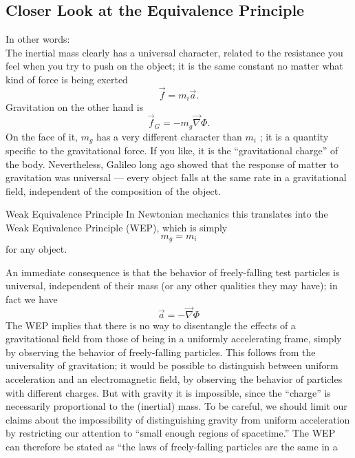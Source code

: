 \subsection{Closer Look at the Equivalence Principle}
In other words:\\
The inertial mass clearly has a universal character, related to the resistance you feel when
you try to push on the object; it is the same constant no matter what kind of force is being
exerted 
\begin{equation}
\vec{f}=m_i \vec{a}.
\end{equation}
Gravitation on the other hand is
\begin{equation}
\vec{f}_G = -m_g \vec{\nabla} \Phi.
\end{equation}
On the face of it, $m_g$ has a very different character than $m_i$ ; it is a quantity specific to the
gravitational force. If you like, it is the “gravitational charge” of the body. Nevertheless,
Galileo long ago showed that the response of matter to gravitation was
universal — every object falls at the same rate in a gravitational field, independent of the
composition of the object.
\begin{mybox}{Weak Equivalence Principle}
In Newtonian mechanics this translates into the Weak Equivalence Principle (WEP), which is
simply
\begin{equation}
m_g = m_i
\end{equation}
for any object.
\end{mybox} 
An immediate consequence is that the behavior of freely-falling test particles
is universal, independent of their mass (or any other qualities they may have); in fact we have
\begin{equation}
\vec{a} =- \vec{\nabla} \Phi
\end{equation}
The WEP implies that there is no way to disentangle the effects of a gravitational field
from those of being in a uniformly accelerating frame, simply by observing the behavior of
freely-falling particles. This follows from the universality of gravitation; it would be possible
to distinguish between uniform acceleration and an electromagnetic field, by observing the
behavior of particles with different charges. But with gravity it is impossible, since the
“charge” is necessarily proportional to the (inertial) mass. To be careful, we should limit our claims about the impossibility of distinguishing gravity
from uniform acceleration by restricting our attention to “small enough regions of spacetime.”
The WEP can therefore be stated as “the laws of freely-falling particles are the same in a
